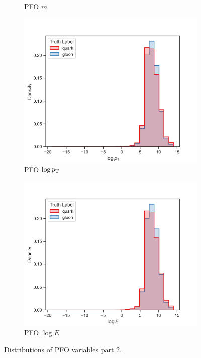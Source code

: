 \begin{figure}[!htb]
\begin{subfigure}[t]{0.49\textwidth}
        \caption{PFO $m$}
        \label{fig:app_pfo_m}
    \end{subfigure}
    \begin{subfigure}[t]{0.49\textwidth}
        \includegraphics[width=\linewidth]{src/plots/distributions/PFOs/log_pT.png}
        \caption{PFO $\log p_\text{T}$}
        \label{fig:app_pfo_log_pT}
    \end{subfigure}
    \begin{subfigure}[t]{0.49\textwidth}
        \includegraphics[width=\linewidth]{src/plots/distributions/PFOs/log_E.png}
        \caption{PFO $\log E$}
        \label{fig:app_pfo_log_E}
    \end{subfigure}
\caption{Distributions of PFO variables part 2.}
\label{fig:app_pfo_variables_2}
\end{figure}

